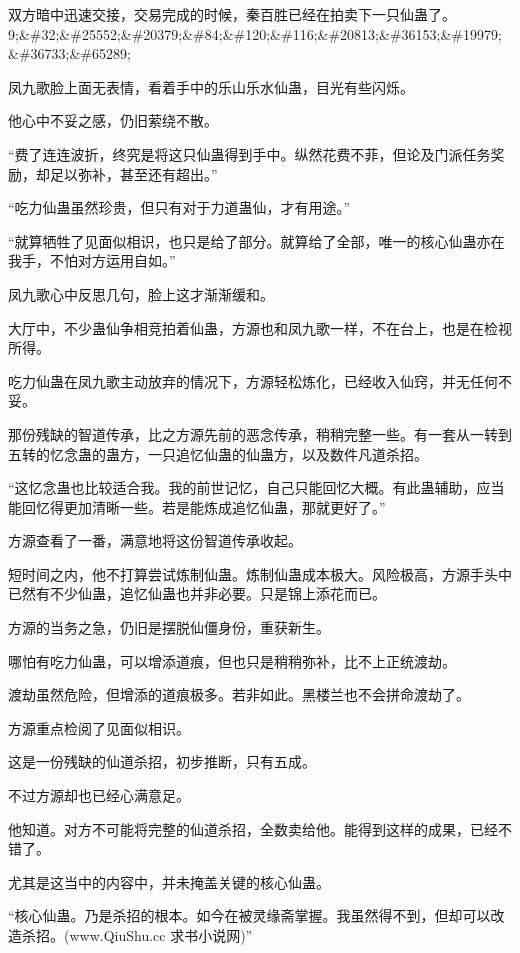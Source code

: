 
\begin{this_body}

双方暗中迅速交接，交易完成的时候，秦百胜已经在拍卖下一只仙蛊了。9;\&\#32;\&\#25552;\&\#20379;\&\#84;\&\#120;\&\#116;\&\#20813;\&\#36153;\&\#19979;\&\#36733;\&\#65289;

凤九歌脸上面无表情，看着手中的乐山乐水仙蛊，目光有些闪烁。

他心中不妥之感，仍旧萦绕不散。

“费了连连波折，终究是将这只仙蛊得到手中。纵然花费不菲，但论及门派任务奖励，却足以弥补，甚至还有超出。”

“吃力仙蛊虽然珍贵，但只有对于力道蛊仙，才有用途。”

“就算牺牲了见面似相识，也只是给了部分。就算给了全部，唯一的核心仙蛊亦在我手，不怕对方运用自如。”

凤九歌心中反思几句，脸上这才渐渐缓和。

大厅中，不少蛊仙争相竞拍着仙蛊，方源也和凤九歌一样，不在台上，也是在检视所得。

吃力仙蛊在凤九歌主动放弃的情况下，方源轻松炼化，已经收入仙窍，并无任何不妥。

那份残缺的智道传承，比之方源先前的恶念传承，稍稍完整一些。有一套从一转到五转的忆念蛊的蛊方，一只追忆仙蛊的仙蛊方，以及数件凡道杀招。

“这忆念蛊也比较适合我。我的前世记忆，自己只能回忆大概。有此蛊辅助，应当能回忆得更加清晰一些。若是能炼成追忆仙蛊，那就更好了。”

方源查看了一番，满意地将这份智道传承收起。

短时间之内，他不打算尝试炼制仙蛊。炼制仙蛊成本极大。风险极高，方源手头中已然有不少仙蛊，追忆仙蛊也并非必要。只是锦上添花而已。

方源的当务之急，仍旧是摆脱仙僵身份，重获新生。

哪怕有吃力仙蛊，可以增添道痕，但也只是稍稍弥补，比不上正统渡劫。

渡劫虽然危险，但增添的道痕极多。若非如此。黑楼兰也不会拼命渡劫了。

方源重点检阅了见面似相识。

这是一份残缺的仙道杀招，初步推断，只有五成。

不过方源却也已经心满意足。

他知道。对方不可能将完整的仙道杀招，全数卖给他。能得到这样的成果，已经不错了。

尤其是这当中的内容中，并未掩盖关键的核心仙蛊。

“核心仙蛊。乃是杀招的根本。如今在被灵缘斋掌握。我虽然得不到，但却可以改造杀招。(www.QiuShu.cc 求书小说网)”


\end{this_body}
